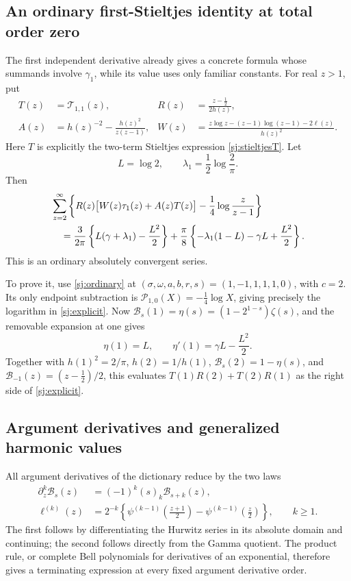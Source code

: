 \subsection{An ordinary first-Stieltjes identity at total order zero}

The first independent derivative already gives a concrete formula whose
summands involve \(\gamma_1\), while its value uses only familiar constants.
For real \(z>1\), put
\begin{align*}
 T(z)&=\mathcal T_{1,1}(z),&
 R(z)&=\frac{z-\frac12}{2h(z)},\\
 A(z)&=h(z)^{-2}-\frac{h(z)^2}{z(z-1)},&
 W(z)&=\frac{z\log z-(z-1)\log(z-1)-2\ell(z)}{h(z)^2}.
\end{align*}
Here \(T\) is explicitly the two-term Stieltjes expression
\eqref{sj:stieltjesT}. Let
\[
 L=\log2,\qquad \lambda_1=\frac12\log\frac2\pi .
\]
Then
\begin{align}
 &\sum_{z=2}^{\infty}
   \left\{
      R(z)\bigl[W(z)\tau_1(z)+A(z)T(z)\bigr]
          -\frac14\log\frac z{z-1}
   \right\}\notag\\
 &\quad=
 \frac{3}{2\pi}\left\{L(\gamma+\lambda_1)-\frac{L^2}{2}\right\}
 +\frac{\pi}{8}\left\{-\lambda_1(1-L)-\gamma L+\frac{L^2}{2}\right\}.
 \label{sj:explicit}
\end{align}
This is an ordinary absolutely convergent series.

To prove it, use \eqref{sj:ordinary} at
\((\sigma,\omega,a,b,r,s)=(1,-1,1,1,1,0)\), with \(c=2\).
Its only endpoint subtraction is
\(\mathcal P_{1,0}(X)=-\frac14\log X\), giving precisely the logarithm
in \eqref{sj:explicit}. Now
\(\mathcal B_s(1)=\eta(s)=(1-2^{1-s})\zeta(s)\), and the removable
expansion at one gives
\[
 \eta(1)=L,\qquad \eta'(1)=\gamma L-\frac{L^2}{2}.
\]
Together with \(h(1)^2=2/\pi\), \(h(2)=1/h(1)\),
\(\mathcal B_s(2)=1-\eta(s)\), and
\(\mathcal B_{-1}(z)=(z-\frac12)/2\), this evaluates
\(T(1)R(2)+T(2)R(1)\) as the right side of \eqref{sj:explicit}.

\subsection{Argument derivatives and generalized harmonic values}

All argument derivatives of the dictionary reduce by the two laws
\begin{align}
 \partial_z^k\mathcal B_s(z)
    &=(-1)^k(s)_k\mathcal B_{s+k}(z),\label{sj:Barg}\\
 \ell^{(k)}(z)
    &=2^{-k}\left\{
       \psi^{(k-1)}\!\left(\frac{z+1}{2}\right)
       -\psi^{(k-1)}\!\left(\frac z2\right)\right\},
       \qquad k\ge1. \label{sj:ellarg}
\end{align}
The first follows by differentiating the Hurwitz series in its absolute
domain and continuing; the second follows directly from the Gamma quotient.
The product rule, or complete Bell polynomials for derivatives of an
exponential, therefore gives a terminating expression at every fixed
argument derivative order.

